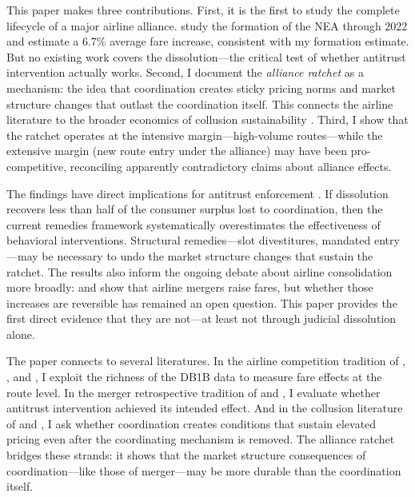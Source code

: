 \documentclass[12pt]{article}
\begin{document}
This paper makes three contributions. First, it is the first to study the complete lifecycle of a major airline alliance. \citet{agrawalni2024} study the formation of the NEA through 2022 and estimate a 6.7\% average fare increase, consistent with my formation estimate. But no existing work covers the dissolution---the critical test of whether antitrust intervention actually works. Second, I document the \textit{alliance ratchet} as a mechanism: the idea that coordination creates sticky pricing norms and market structure changes that outlast the coordination itself. This connects the airline literature to the broader economics of collusion sustainability \citep{porter1999,asker2010}. Third, I show that the ratchet operates at the intensive margin---high-volume routes---while the extensive margin (new route entry under the alliance) may have been pro-competitive, reconciling apparently contradictory claims about alliance effects.

The findings have direct implications for antitrust enforcement \citep{werden2004}. If dissolution recovers less than half of the consumer surplus lost to coordination, then the current remedies framework systematically overestimates the effectiveness of behavioral interventions. Structural remedies---slot divestitures, mandated entry---may be necessary to undo the market structure changes that sustain the ratchet. The results also inform the ongoing debate about airline consolidation more broadly: \citet{borenstein1990} and \citet{kimsingal1993} show that airline mergers raise fares, but whether those increases are reversible has remained an open question. This paper provides the first direct evidence that they are not---at least not through judicial dissolution alone.

The paper connects to several literatures. In the airline competition tradition of \citet{borensteinrose1994}, \citet{berry1992}, and \citet{peters2006}, I exploit the richness of the DB1B data to measure fare effects at the route level. In the merger retrospective tradition of \citet{dafny2009} and \citet{wollmann2019}, I evaluate whether antitrust intervention achieved its intended effect. And in the collusion literature of \citet{miller2009} and \citet{sweeting2009}, I ask whether coordination creates conditions that sustain elevated pricing even after the coordinating mechanism is removed. The alliance ratchet bridges these strands: it shows that the market structure consequences of coordination---like those of merger---may be more durable than the coordination itself.
\end{document}
